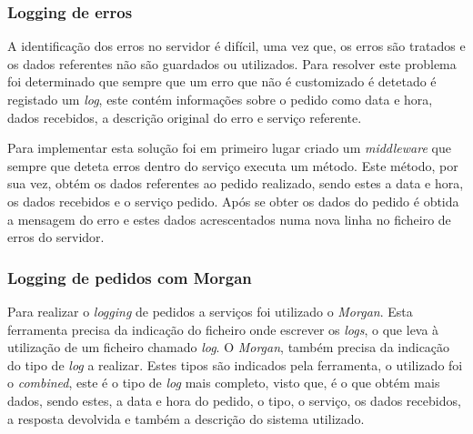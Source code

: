 \subsubsection{Logging de erros}

A identificação dos erros no servidor é difícil, uma vez que, os erros são tratados e os dados referentes não são guardados ou utilizados. Para resolver este problema foi determinado que sempre que um erro que não é customizado é detetado é registado um \textit{log}, este contém informações sobre o pedido como data e hora, dados recebidos, a descrição original do erro e serviço referente.

Para implementar esta solução foi em primeiro lugar criado um \textit{middleware} que sempre que deteta erros dentro do serviço executa um método. Este método, por sua vez, obtém os dados referentes ao pedido realizado, sendo estes a data e hora, os dados recebidos e o serviço pedido. Após se obter os dados do pedido é obtida a mensagem do erro e estes dados acrescentados numa nova linha no ficheiro de erros do servidor.

\subsubsection{Logging de pedidos com Morgan}

Para realizar o \textit{logging} de pedidos a serviços foi utilizado o \textit{Morgan}. Esta ferramenta precisa da indicação do ficheiro onde escrever os \textit{logs}, o que leva à utilização de um ficheiro chamado \textit{log}. O \textit{Morgan}, também precisa da indicação do tipo de \textit{log} a realizar. Estes tipos são indicados pela ferramenta, o utilizado foi o \textit{combined}, este é o tipo de \textit{log} mais completo, visto que, é o que obtém mais dados, sendo estes, a data e hora do pedido, o tipo, o serviço, os dados recebidos, a resposta devolvida e também a descrição do sistema utilizado.